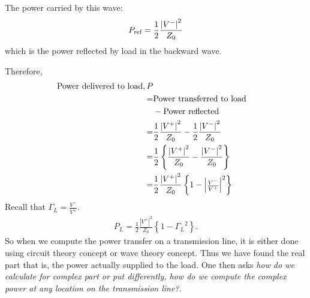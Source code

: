 The power carried by this wave:
\begin{align*}
P_{\textnormal{ref}} = \frac{1}{2}\frac{{|V^-|}^2}{Z_0}
\end{align*}
which is the power reflected by load in the backward wave.

Therefore,
\begin{align*} 
\textnormal{Power delivered to load}, P\\
=& \textnormal{Power transferred to load}\\
&- \textnormal{Power reflected}\\
=& \frac{1}{2} \frac{{|V^+|}^2}{Z_0} -\frac{1}{2} \frac{{|V^-|}^2 }{Z_0}\\
=& \frac{1}{2} \left\lbrace \frac{{|V^+| }^2}{Z_0} -\frac{ {|V^-|}^2 }{Z_0} \right\rbrace\\
=& \frac{1}{2} \frac{{|V^+|}^2}{Z_0} \left\lbrace 1 - {
\begin{vmatrix}
\frac{V^-}{V^+}
\end{vmatrix}^2}\right\rbrace
\end{align*}
Recall that $\Gamma_L =\frac{V^-}{V^+}$.
\begin{align*}
P_L=\frac{1}{2} \frac{{|V^+|}^2}{Z_0} \left\lbrace 1 - { \Gamma_L }^2 \right\rbrace.
\end{align*}
So when we compute the power transfer on a transmission line, it is either done using circuit theory concept or wave theory concept. Thus we have found the real part that is, the power actually supplied to the load. One then asks \emph{how do we calculate for complex part or put differently, how do we compute the complex power at any location on the transmission line?}. 

